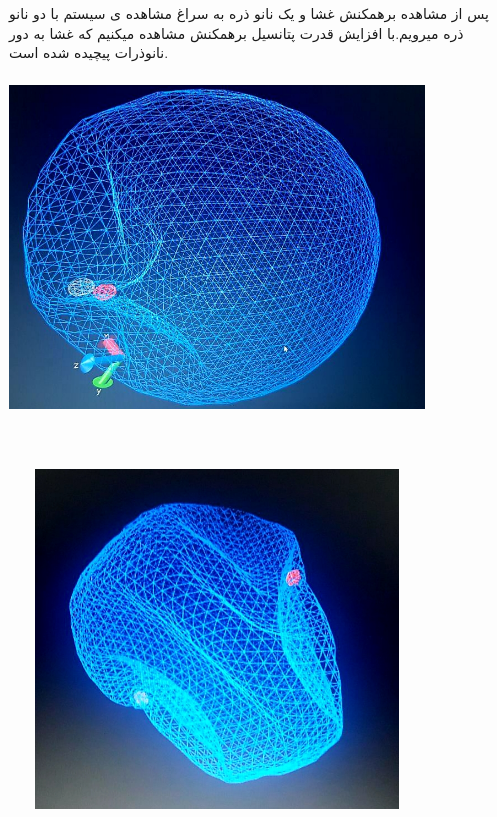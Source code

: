 \documentclass[12pt,onecolumn,a4paper]{report}
\begin{document}
{پس از مشاهده برهمکنش غشا و یک نانو ذره به سراغ مشاهده ی سیستم با دو نانو ذره میرویم.با افزایش قدرت پتانسیل برهمکنش مشاهده میکنیم که غشا به 
دور نانوذرات پیچیده شده است.
\begin{center}
\includegraphics[width=11cm, height=9cm]{20210213_204324.jpg}
\end{center}\\




\begin{center}
\includegraphics[width=11cm, height=9cm]{20210213_204232.jpg}
\end{center}\\


}
\end{document}
